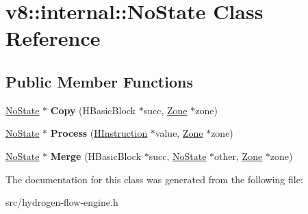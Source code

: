 \hypertarget{classv8_1_1internal_1_1_no_state}{}\section{v8\+:\+:internal\+:\+:No\+State Class Reference}
\label{classv8_1_1internal_1_1_no_state}
\subsection*{Public Member Functions}
\begin{DoxyCompactItemize}
\item 
\hypertarget{classv8_1_1internal_1_1_no_state_aaadf2e07f1ad0411e869b0bbaf6b0c9e}{}\hyperlink{classv8_1_1internal_1_1_no_state}{No\+State} $\ast$ {\bfseries Copy} (H\+Basic\+Block $\ast$succ, \hyperlink{classv8_1_1internal_1_1_zone}{Zone} $\ast$zone)\label{classv8_1_1internal_1_1_no_state_aaadf2e07f1ad0411e869b0bbaf6b0c9e}

\item 
\hypertarget{classv8_1_1internal_1_1_no_state_a875e115daa326ce075cd255a56c4e999}{}\hyperlink{classv8_1_1internal_1_1_no_state}{No\+State} $\ast$ {\bfseries Process} (\hyperlink{classv8_1_1internal_1_1_h_instruction}{H\+Instruction} $\ast$value, \hyperlink{classv8_1_1internal_1_1_zone}{Zone} $\ast$zone)\label{classv8_1_1internal_1_1_no_state_a875e115daa326ce075cd255a56c4e999}

\item 
\hypertarget{classv8_1_1internal_1_1_no_state_a24c4643d3bf9434eb6da2fbda08791ab}{}\hyperlink{classv8_1_1internal_1_1_no_state}{No\+State} $\ast$ {\bfseries Merge} (H\+Basic\+Block $\ast$succ, \hyperlink{classv8_1_1internal_1_1_no_state}{No\+State} $\ast$other, \hyperlink{classv8_1_1internal_1_1_zone}{Zone} $\ast$zone)\label{classv8_1_1internal_1_1_no_state_a24c4643d3bf9434eb6da2fbda08791ab}

\end{DoxyCompactItemize}


The documentation for this class was generated from the following file\+:\begin{DoxyCompactItemize}
\item 
src/hydrogen-\/flow-\/engine.\+h\end{DoxyCompactItemize}
